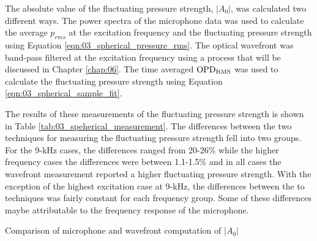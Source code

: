 The absolute value of the fluctuating pressure strength, $|A_0|$, was calculated two different ways.
The power spectra of the microphone data was used to calculate the average $p_{rms}$ at the excitation frequency and the fluctuating pressure strength using Equation \ref{eqn:03_spherical_pressure_rms}.
The optical wavefront was band-pass filtered at the excitation frequency using a process that will be discussed in Chapter \ref{chap:06}.
The time averaged $\operatorname{OPD_{RMS}}$ was used to calculate the fluctuating pressure strength using Equation \ref{eqn:03_spherical_sample_fit}.

The results of these measurements of the fluctuating pressure strength is shown in Table \ref{tab:03_speherical_measurement}.
The differences between the two techniques for measuring the fluctuating pressure strength fell into two groups.
For the 9-kHz cases, the differences ranged from 20-26\% while the higher frequency cases the differences were between 1.1-1.5\% and in all cases the wavefront measurement reported a higher fluctuating pressure strength.
With the exception of the highest excitation case at 9-kHz, the differences between the to techniques was fairly constant for each frequency group.
Some of these differences maybe attributable to the frequency response of the microphone.
\begin{table}
  \centering
  \caption{Comparison of microphone and wavefront computation of $|A_0|$}
  
  \label{tab:03_speherical_measurement}
\end{table}

